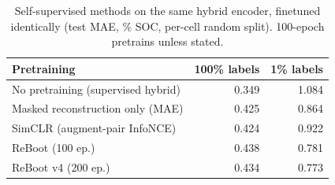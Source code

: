 \begin{table}[t]
\centering
\caption{Self-supervised methods on the same hybrid encoder, finetuned identically (test MAE, \% SOC, per-cell random split). 100-epoch pretrains unless stated.}
\label{tab:ssl}
\begin{tabular}{lrr}
\toprule
Pretraining & 100\% labels & 1\% labels \\
\midrule
No pretraining (supervised hybrid) & 0.349 & 1.084 \\
Masked reconstruction only (MAE) & 0.425 & 0.864 \\
SimCLR (augment-pair InfoNCE) & 0.424 & 0.922 \\
ReBoot (100 ep.) & 0.438 & 0.781 \\
ReBoot v4 (200 ep.) & 0.434 & 0.773 \\
\bottomrule
\end{tabular}
\end{table}